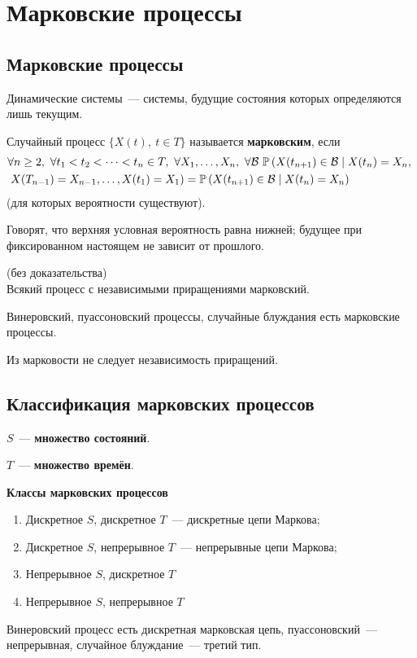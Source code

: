 \newpage
{}
\section{Марковские процессы}
\subsection{Марковские процессы}
Динамические системы~--- системы, будущие состояния которых определяются лишь
текущим.
\begin{Def}
    Случайный процесс $\{X(t), \ t \in T\}$ называется \textbf{марковским},
    если
    \begin{align*}
      & \forall n \geq 2, \ \forall t_1 < t_2 < \dots < t_n \in T, \ \forall X_1, \dots, X_n, \ \forall \mathcal{B} \ \mathbb{P}\left( X(t_{n+1}) \in\mathcal{B} \mid X(t_n) = X_n, \right. \\
      & \left. X(T_{n-1}) = X_{n-1}, \dots, X(t_1) = X_1 \right) = \mathbb{P}\left( X(t_{n+1}) \in\mathcal{B} \mid X(t_n) = X_n \right)
    \end{align*}
    (для которых вероятности существуют).
\end{Def}
Говорят, что верхняя условная вероятность равна нижней; будущее при
фиксированном настоящем не зависит от прошлого.
\begin{theorem} (без доказательства)
    \\
    Всякий процесс с независимыми приращениями марковский.
\end{theorem}
\begin{corollary}
    Винеровский, пуассоновский процессы, случайные блуждания есть марковские процессы.
\end{corollary}
\begin{Note}
    Из марковости не следует независимость приращений.
\end{Note}
\subsection{Классификация марковских процессов}
\begin{Def}
    $S$~--- \textbf{множество состояний}.
\end{Def}
\begin{Def}
    $T$~--- \textbf{множество времён}.
\end{Def}
\textbf{Классы марковских процессов}
\begin{enumerate}
    \item Дискретное $S$, дискретное $T$~--- дискретные цепи Маркова;
    \item Дискретное $S$, непрерывное $T$~--- непрерывные цепи Маркова;
    \item Непрерывное $S$, дискретное $T$
    \item Непрерывное $S$, непрерывное $T$
\end{enumerate}
\begin{example}
    Винеровский процесс есть дискретная марковская цепь, пуассоновский~---
    непрерывная, случайное блуждание~--- третий тип.
\end{example}
